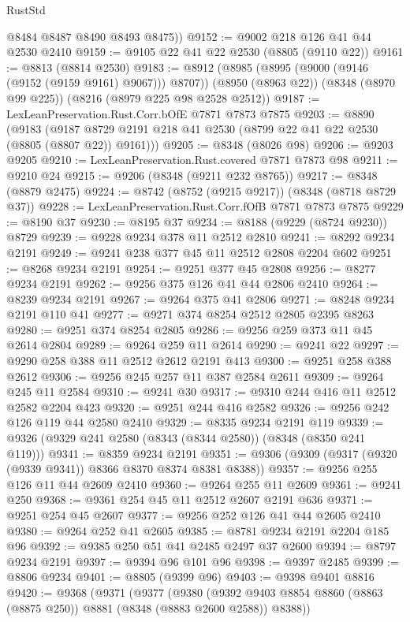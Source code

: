 \begin{lexlean}{RustStd}
\begin{coremodule}
{\begin{coremodule}
{{{{{{{{{{{{{{{{{{{{{{{{{{{{{{{{{{{{{{{{{{{{{{{{{{        @8484
        @8487
        @8490
        @8493
        @8475))
@9152 := @9002 @218 @126 @41 @44 @2530 @2410
@9159 := @9105 @22 @41 @22 @2530 (@8805 (@9110 @22))
@9161 := @8813 (@8814 @2530)
@9183 := @8912
    (@8985 (@8995 (@9000 (@9146 (@9152 (@9159 @9161) @9067))) @8707))
    (@8950 (@8963 @22))
    (@8348 (@8970 @99 @225))
    (@8216 (@8979 @225 @98 @2528 @2512))
@9187 := LexLeanPreservation.Rust.Corr.bOfE @7871 @7873 @7875
@9203 := @8890
    (@9183 (@9187 @8729 @2191 @218 @41 @2530 (@8799 @22 @41 @22 @2530 (@8805 (@8807 @22)) @9161)))
@9205 := @8348 (@8026 @98)
@9206 := @9203 @9205
@9210 := LexLeanPreservation.Rust.covered @7871 @7873 @98
@9211 := @9210 @24
@9215 := @9206 (@8348 (@9211 @232 @8765))
@9217 := @8348 (@8879 @2475)
@9224 := @8742 (@8752 (@9215 @9217)) (@8348 (@8718 @8729 @37))
@9228 := LexLeanPreservation.Rust.Corr.fOfB @7871 @7873 @7875
@9229 := @8190 @37
@9230 := @8195 @37
@9234 := @8188 (@9229 (@8724 @9230)) @8729
@9239 := @9228 @9234 @378 @11 @2512 @2810
@9241 := @8292 @9234 @2191
@9249 := @9241 @238 @377 @45 @11 @2512 @2808 @2204 @602
@9251 := @8268 @9234 @2191
@9254 := @9251 @377 @45 @2808
@9256 := @8277 @9234 @2191
@9262 := @9256 @375 @126 @41 @44 @2806 @2410
@9264 := @8239 @9234 @2191
@9267 := @9264 @375 @41 @2806
@9271 := @8248 @9234 @2191 @110 @41
@9277 := @9271 @374 @8254 @2512 @2805 @2395 @8263
@9280 := @9251 @374 @8254 @2805
@9286 := @9256 @259 @373 @11 @45 @2614 @2804
@9289 := @9264 @259 @11 @2614
@9290 := @9241 @22
@9297 := @9290 @258 @388 @11 @2512 @2612 @2191 @413
@9300 := @9251 @258 @388 @2612
@9306 := @9256 @245 @257 @11 @387 @2584 @2611
@9309 := @9264 @245 @11 @2584
@9310 := @9241 @30
@9317 := @9310 @244 @416 @11 @2512 @2582 @2204 @423
@9320 := @9251 @244 @416 @2582
@9326 := @9256 @242 @126 @119 @44 @2580 @2410
@9329 := @8335 @9234 @2191 @119
@9339 := @9326 (@9329 @241 @2580 (@8343 (@8344 @2580)) (@8348 (@8350 @241 @119)))
@9341 := @8359 @9234 @2191
@9351 := @9306 (@9309 (@9317 (@9320 (@9339 @9341)) @8366 @8370 @8374 @8381 @8388))
@9357 := @9256 @255 @126 @11 @44 @2609 @2410
@9360 := @9264 @255 @11 @2609
@9361 := @9241 @250
@9368 := @9361 @254 @45 @11 @2512 @2607 @2191 @636
@9371 := @9251 @254 @45 @2607
@9377 := @9256 @252 @126 @41 @44 @2605 @2410
@9380 := @9264 @252 @41 @2605
@9385 := @8781 @9234 @2191 @2204 @185 @96
@9392 := @9385 @250 @51 @41 @2485 @2497 @37 @2600
@9394 := @8797 @9234 @2191
@9397 := @9394 @96 @101 @96
@9398 := @9397 @2485
@9399 := @8806 @9234
@9401 := @8805 (@9399 @96)
@9403 := @9398 @9401 @8816
@9420 := @9368
    (@9371
      (@9377
        (@9380
          (@9392 @9403 @8854 @8860 (@8863 (@8875 @250)) @8881 (@8348 (@8883 @2600 @2588)) @8388))
}}}}}}}}}}}}}}}}}}}}}}}}}}}}}}}}}}}}}}}}}}}}}}}}}}
\end{coremodule}}
\end{coremodule}
\end{lexlean}
